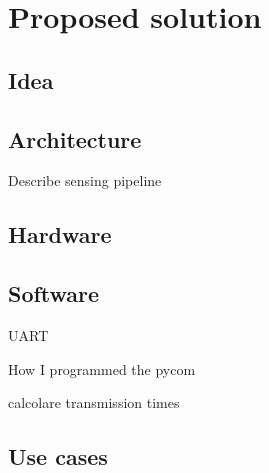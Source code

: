 
\chapter{Proposed solution}\label{chapter:proposed_solution}

\section{Idea}

\section{Architecture}

Describe sensing pipeline 

\section{Hardware}

\section{Software}


UART

How I programmed the pycom



calcolare transmission times

\section{Use cases}